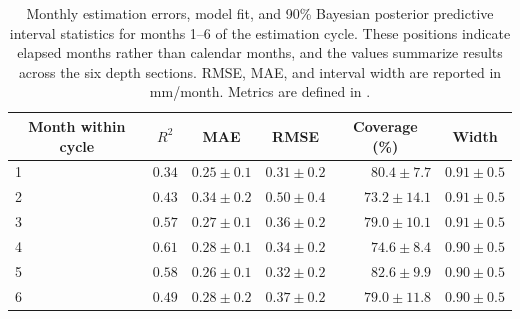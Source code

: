 \begin{table}[htbp]
	\centering
	\small
	\renewcommand{\arraystretch}{1.15}
	\caption[Monthly estimation results by position within each cycle.]{Monthly estimation errors, model fit, and 90\% Bayesian posterior predictive interval statistics for months 1--6 of the estimation cycle. These positions indicate elapsed months rather than calendar months, and the values summarize results across the six depth sections. RMSE, MAE, and interval width are reported in mm/month. Metrics are defined in .}
	\label{tab:delayed_performance_by_month}
	\begin{tabular}{l|r|r|r|r|r}
		\toprule
		\multicolumn{1}{c|}{\textbf{Month within cycle}} & \multicolumn{1}{c|}{\textbf{$R^2$}} & \multicolumn{1}{c|}{\textbf{MAE}} & \multicolumn{1}{c|}{\textbf{RMSE}} & \multicolumn{1}{c|}{\textbf{Coverage (\%)}} & \multicolumn{1}{c}{\textbf{Width}} \\
		\midrule
		1 & $0.34$ & $0.25\pm0.1$ & $0.31\pm0.2$ & $80.4\pm7.7$ & $0.91\pm0.5$ \\
		2 & $0.43$ & $0.34\pm0.2$ & $0.50\pm0.4$ & $73.2\pm14.1$ & $0.91\pm0.5$ \\
		3 & $0.57$ & $0.27\pm0.1$ & $0.36\pm0.2$ & $79.0\pm10.1$ & $0.91\pm0.5$ \\
		4 & $0.61$ & $0.28\pm0.1$ & $0.34\pm0.2$ & $74.6\pm8.4$ & $0.90\pm0.5$ \\
		5 & $0.58$ & $0.26\pm0.1$ & $0.32\pm0.2$ & $82.6\pm9.9$ & $0.90\pm0.5$ \\
		6 & $0.49$ & $0.28\pm0.2$ & $0.37\pm0.2$ & $79.0\pm11.8$ & $0.90\pm0.5$ \\
		\bottomrule
	\end{tabular}
\end{table}

